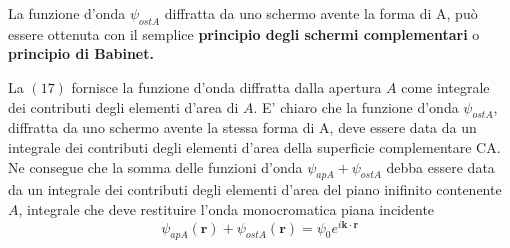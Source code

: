 La funzione d'onda \(\psi_{ost A}\) diffratta da uno schermo avente la
forma di A, può essere ottenuta con il semplice \textbf{principio degli
schermi complementari} o \textbf{principio di Babinet.}

La $(17)$ fornisce la funzione d'onda diffratta dalla apertura $A$ come integrale dei contributi degli elementi d'area di $A$.
E' chiaro che la funzione d'onda $\psi_{ost A}$, diffratta da uno schermo avente la stessa forma di A, deve essere data da un integrale dei contributi degli elementi d'area della superficie complementare CA. Ne consegue che la somma delle funzioni d'onda $\psi_{ap A}+ \psi_{ost A}$ debba essere data da un integrale dei contributi degli elementi d'area del piano inifinito contenente $A$, integrale che deve restituire l'onda monocromatica piana incidente \[
	\psi_{ap A}(\bm{r})+ \psi_{ost A}(\bm{r}) = \psi_0e^{i \bm{k} \cdot \bm{r}}
\]
